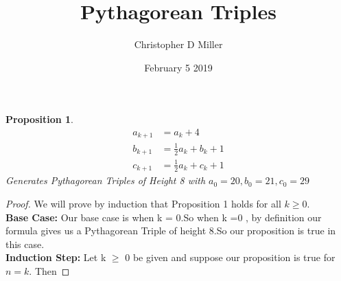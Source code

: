 \documentclass[12pt]{article}
\title{Pythagorean Triples}
\author{Christopher D Miller}
\date{February 5 2019}
\theoremstyle{plain}
\newtheorem{proposition}{Proposition}
\begin{document}
\maketitle
\begin{proposition}
    \begin{align*}
        a_{k+1} &= a_{k} +4\\ 
        b_{k+1} &= \frac{1}{2} a_{k} + b_{k} +1\\
        c_{k+1} &= \frac{1}{2}a_k + c_k +1
    \end{align*}
    Generates Pythagorean Triples of Height 8 with $a_0=20,b_0 = 21,c_0 = 29$
    
\end{proposition}
\begin{proof}     
We will prove by induction that Proposition 1 holds for all $k \geq 0$.\\\textbf{Base Case:} Our base case is when k = 0.So when k =0 , by definition our formula gives us a Pythagorean Triple of height 8.So our proposition is true in this case.\\
\textbf{Induction Step:} Let k $\geq$ 0 be given and suppose our proposition is true for $n=k$. Then  
\end{proof}
\end{document}
